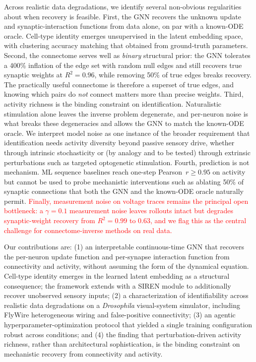 \documentclass{article}
\begin{document}
Across realistic data degradations, we identify several non-obvious regularities about when recovery is feasible.
First, the GNN recovers the unknown update and synaptic-interaction functions from data alone, on par with a known-ODE oracle.
Cell-type identity emerges unsupervised in the latent embedding space, with clustering accuracy matching that obtained from ground-truth parameters.
Second, the connectome serves well as \emph{binary} structural prior: the GNN tolerates a 400\% inflation of the edge set with random null edges and still recovers true synaptic weights at $R^2=0.96$, while removing 50\% of true edges breaks recovery.
The practically useful connectome is therefore a superset of true edges, and knowing which pairs do \emph{not} connect matters more than precise weights.
Third, activity richness is the binding constraint on identification.
Naturalistic stimulation alone leaves the inverse problem degenerate, and per-neuron noise is what breaks these degeneracies and allows the GNN to match the known-ODE oracle.
We interpret model noise as one instance of the broader requirement that identification needs activity diversity beyond passive sensory drive, whether through intrinsic stochasticity or (by analogy and to be tested) through extrinsic perturbations such as targeted optogenetic stimulation.
Fourth, prediction is not mechanism.
ML sequence baselines reach one-step Pearson~$r\geq0.95$ on activity but cannot be used to probe mechanistic interventions such as ablating 50\% of synaptic connections that both the GNN and the known-ODE oracle naturally permit.
\textcolor{red}{Finally, measurement noise on voltage traces remains the principal open bottleneck: a $\gamma = 0.1$ measurement noise leaves rollouts intact but degrades synaptic-weight recovery from $R^2 = 0.99$ to $0.63$, and we flag this as the central challenge for connectome-inverse methods on real data.}

Our contributions are:
(1) an interpretable continuous-time GNN that recovers the per-neuron update function and per-synapse interaction function from connectivity and activity, without assuming the form of the dynamical equation.
Cell-type identity emerges in the learned latent embedding as a structural consequence; the framework extends with a SIREN module to additionally recover unobserved sensory inputs;
(2) a characterization of identifiability across realistic data degradations on a \emph{Drosophila} visual-system simulator, including FlyWire heterogeneous wiring and false-positive connectivity;
(3) an agentic hyperparameter-optimization protocol that yielded a single training configuration robust across conditions; and
(4) the finding that perturbation-driven activity richness, rather than architectural sophistication, is the binding constraint on mechanistic recovery from connectivity and activity.
\end{document}
